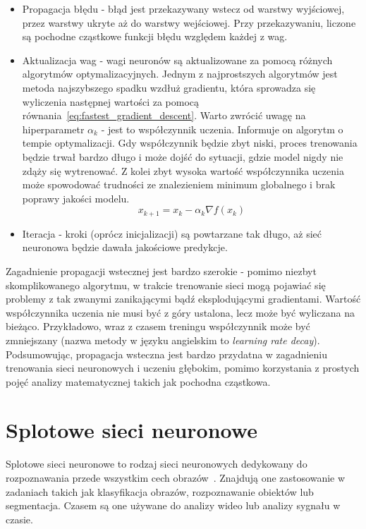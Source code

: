 \begin{itemize}
    \item Propagacja błędu - błąd jest przekazywany wstecz od warstwy wyjściowej, przez warstwy ukryte aż do warstwy wejściowej.
    Przy przekazywaniu, liczone są pochodne cząstkowe funkcji błędu względem każdej z wag.
    \item Aktualizacja wag - wagi neuronów są aktualizowane za pomocą różnych algorytmów optymalizacyjnych.
    Jednym z najprostszych algorytmów jest metoda najszybszego spadku wzdłuż gradientu, która sprowadza się wyliczenia następnej wartości za pomocą równania~\ref{eq:fastest_gradient_descent}.
    Warto zwrócić uwagę na hiperparametr $\alpha_k$ - jest to współczynnik uczenia.
    Informuje on algorytm o tempie optymalizacji.
    Gdy współczynnik będzie zbyt niski, proces trenowania będzie trwał bardzo długo i może dojść do sytuacji, gdzie model nigdy nie zdąży się wytrenować.
    Z kolei zbyt wysoka wartość współczynnika uczenia może spowodować trudności ze znalezieniem minimum globalnego i brak poprawy jakości modelu.
    \begin{equation}
        x_{k+1} = x_k - \alpha_k \nabla f(x_k)\label{eq:fastest_gradient_descent}
    \end{equation}
    \item Iteracja - kroki (oprócz inicjalizacji) są powtarzane tak długo, aż sieć neuronowa będzie dawała jakościowe predykcje.
\end{itemize}

Zagadnienie propagacji wstecznej jest bardzo szerokie - pomimo niezbyt skomplikowanego algorytmu, w trakcie trenowanie sieci mogą pojawiać się problemy z tak zwanymi zanikającymi bądź eksplodującymi gradientami.
Wartość współczynnika uczenia nie musi być z góry ustalona, lecz może być wyliczana na bieżąco.
Przykładowo, wraz z czasem treningu współczynnik może być zmniejszany (nazwa metody w języku angielskim to \textit{learning rate decay}).
Podsumowując, propagacja wsteczna jest bardzo przydatna w zagadnieniu trenowania sieci neuronowych i uczeniu głębokim, pomimo korzystania z prostych pojęć analizy matematycznej takich jak pochodna cząstkowa.


\section{Splotowe sieci neuronowe}

Splotowe sieci neuronowe to rodzaj sieci neuronowych dedykowany do rozpoznawania przede wszystkim cech obrazów~\cite{geron}.
Znajdują one zastosowanie w zadaniach takich jak klasyfikacja obrazów, rozpoznawanie obiektów lub segmentacja.
Czasem są one używane do analizy wideo lub analizy sygnału w czasie.

